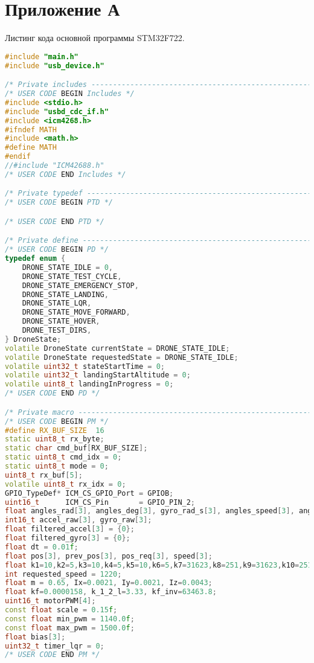 \chapter{Приложение А}

Листинг кода основной программы STM32F722.

\begin{lstlisting}[language=C++]
#include "main.h"
#include "usb_device.h"

/* Private includes ----------------------------------------------------------*/
/* USER CODE BEGIN Includes */
#include <stdio.h>
#include "usbd_cdc_if.h"
#include <icm4268.h>
#ifndef MATH
#include <math.h>
#define MATH
#endif
//#include "ICM42688.h"
/* USER CODE END Includes */

/* Private typedef -----------------------------------------------------------*/
/* USER CODE BEGIN PTD */

/* USER CODE END PTD */

/* Private define ------------------------------------------------------------*/
/* USER CODE BEGIN PD */
typedef enum {
    DRONE_STATE_IDLE = 0,
    DRONE_STATE_TEST_CYCLE,
    DRONE_STATE_EMERGENCY_STOP,
    DRONE_STATE_LANDING,
    DRONE_STATE_LQR,
    DRONE_STATE_MOVE_FORWARD,
    DRONE_STATE_HOVER,
    DRONE_TEST_DIRS,
} DroneState;
volatile DroneState currentState = DRONE_STATE_IDLE;
volatile DroneState requestedState = DRONE_STATE_IDLE;
volatile uint32_t stateStartTime = 0;
volatile uint32_t landingStartAltitude = 0;
volatile uint8_t landingInProgress = 0;
/* USER CODE END PD */

/* Private macro -------------------------------------------------------------*/
/* USER CODE BEGIN PM */
#define RX_BUF_SIZE  16
static uint8_t rx_byte;
static char cmd_buf[RX_BUF_SIZE];
static uint8_t cmd_idx = 0;
static uint8_t mode = 0;
uint8_t rx_buf[5];
volatile uint8_t rx_idx = 0;
GPIO_TypeDef* ICM_CS_GPIO_Port = GPIOB;
uint16_t      ICM_CS_Pin       = GPIO_PIN_2;
float angles_rad[3], angles_deg[3], gyro_rad_s[3], angles_speed[3], angles_rad_prev[3];
int16_t accel_raw[3], gyro_raw[3];
float filtered_accel[3] = {0};
float filtered_gyro[3] = {0};
float dt = 0.01f;
float pos[3], prev_pos[3], pos_req[3], speed[3];
float k1=10,k2=5,k3=10,k4=5,k5=10,k6=5,k7=31623,k8=251,k9=31623,k10=251,k11=0,k12=0;
int requested_speed = 1220;
float m = 0.65, Ix=0.0021, Iy=0.0021, Iz=0.0043;
float kf=0.0000158, k_1_2_l=3.33, kf_inv=63463.8;
uint16_t motorPWM[4];
const float scale = 0.15f;
const float min_pwm = 1140.0f;
const float max_pwm = 1500.0f;
float bias[3];
uint32_t timer_lqr = 0;
/* USER CODE END PM */


\end{lstlisting}
